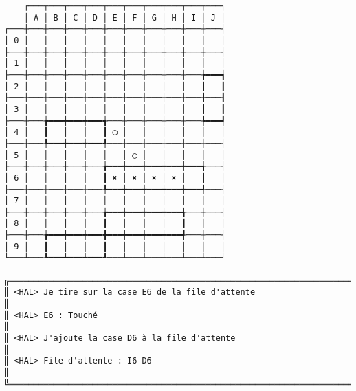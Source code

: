 {\scriptsize
\begin{verbatim}
    ┌───┬───┬───┬───┬───┬───┬───┬───┬───┬───┐
    │ A │ B │ C │ D │ E │ F │ G │ H │ I │ J │
┌───┼───┼───┼───┼───┼───┼───┼───┼───┼───┼───┤
│ 0 │   │   │   │   │   │   │   │   │   │   │
├───┼───┼───┼───┼───┼───┼───┼───┼───┼───┼───┤
│ 1 │   │   │   │   │   │   │   │   │   │   │
├───┼───┼───┼───┼───┼───┼───┼───┼───┼───╆━━━┪
│ 2 │   │   │   │   │   │   │   │   │   ┃   ┃
├───┼───┼───┼───┼───┼───┼───┼───┼───┼───╂───┨
│ 3 │   │   │   │   │   │   │   │   │   ┃   ┃
├───┼───╆━━━┿━━━┿━━━╅───┼───┼───┼───┼───╄━━━┩
│ 4 │   ┃   │   │   ┃ ◯ │   │   │   │   │   │
├───┼───╄━━━┿━━━┿━━━╃───┼───┼───┼───┼───┼───┤
│ 5 │   │   │   │   │   │ ◯ │   │   │   │   │
├───┼───┼───┼───┼───╆━━━┿━━━┿━━━┿━━━┿━━━╅───┤
│ 6 │   │   │   │   ┃ ✖ │ ✖ │ ✖ │ ✖ │   ┃   │
├───┼───┼───┼───┼───╄━━━┿━━━┿━━━┿━━━┿━━━╃───┤
│ 7 │   │   │   │   │   │   │   │   │   │   │
├───┼───┼───┼───┼───╆━━━┿━━━┿━━━┿━━━╅───┼───┤
│ 8 │   │   │   │   ┃   │   │   │   ┃   │   │
├───┼───╆━━━┿━━━┿━━━╋━━━┿━━━┿━━━┿━━━╃───┼───┤
│ 9 │   ┃   │   │   ┃   │   │   │   │   │   │
└───┴───┺━━━┷━━━┷━━━┹───┴───┴───┴───┴───┴───┘

╔══════════════════════════════════════════════════════════════════════════════════════════════════╗
║ <HAL> Je tire sur la case E6 de la file d'attente                                                ║
║ <HAL> E6 : Touché                                                                                ║
║ <HAL> J'ajoute la case D6 à la file d'attente                                                    ║
║ <HAL> File d'attente : I6 D6                                                                     ║
╚══════════════════════════════════════════════════════════════════════════════════════════════════╝
\end{verbatim}}
\newpage


